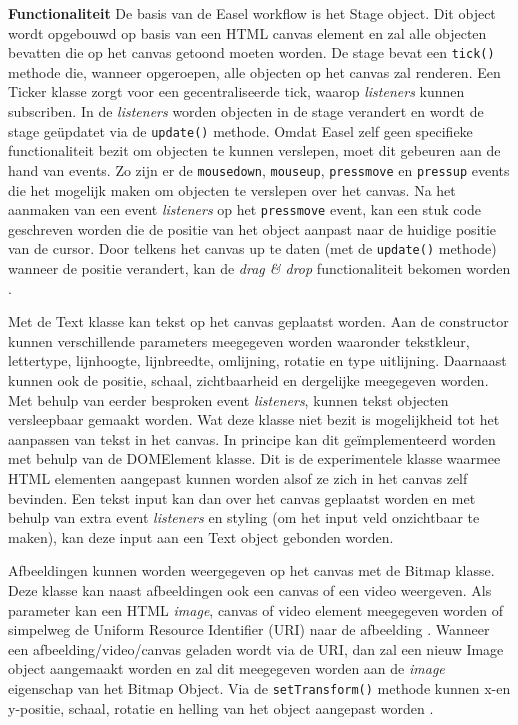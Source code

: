 \textbf{Functionaliteit} \break
De basis van de Easel workflow is het Stage object. Dit object wordt opgebouwd op basis van een HTML canvas element en zal alle objecten bevatten die op het canvas getoond moeten worden. De stage bevat een \texttt{tick()} methode die, wanneer opgeroepen, alle objecten op het canvas zal renderen. Een Ticker klasse zorgt voor een gecentraliseerde tick, waarop \textit{listeners} kunnen subscriben. In de \textit{listeners} worden objecten in de stage verandert en wordt de stage ge\"{u}pdatet via de \texttt{update()} methode. Omdat Easel zelf geen specifieke functionaliteit bezit om objecten te kunnen verslepen, moet dit gebeuren aan de hand van events. Zo zijn er de \texttt{mousedown}, \texttt{mouseup}, \texttt{pressmove} en \texttt{pressup} events die het mogelijk maken om objecten te verslepen over het canvas. Na het aanmaken van een event \textit{listeners} op het \texttt{pressmove} event, kan een stuk code geschreven worden die de positie van het object aanpast naar de huidige positie van de cursor. Door telkens het canvas up te daten (met de \texttt{update()} methode) wanneer de positie verandert, kan de \textit{drag \& drop} functionaliteit bekomen worden \cite{EaselMouseInteraction}.  

Met de Text klasse kan tekst op het canvas geplaatst worden. Aan de constructor kunnen verschillende parameters meegegeven worden waaronder tekstkleur, lettertype, lijnhoogte, lijnbreedte, omlijning, rotatie en type uitlijning. Daarnaast kunnen ook de positie, schaal, zichtbaarheid en dergelijke meegegeven worden. Met behulp van eerder besproken event \textit{listeners}, kunnen tekst objecten versleepbaar gemaakt worden. Wat deze klasse niet bezit is mogelijkheid tot het aanpassen van tekst in het canvas. In principe kan dit ge\"{i}mplementeerd worden met behulp van de DOMElement klasse. Dit is de experimentele klasse waarmee HTML elementen aangepast kunnen worden alsof ze zich in het canvas zelf bevinden. Een tekst input kan dan over het canvas geplaatst worden en met behulp van extra event \textit{listeners} en styling (om het input veld onzichtbaar te maken), kan deze input aan een Text object gebonden worden. 

Afbeeldingen kunnen worden weergegeven op het canvas met de Bitmap klasse. Deze klasse kan naast afbeeldingen ook een canvas of een video weergeven. Als parameter kan een HTML \textit{image}, canvas of video element meegegeven worden of simpelweg de Uniform Resource Identifier (URI) naar de afbeelding \cite{URI}. Wanneer een afbeelding/video/canvas geladen wordt via de URI, dan zal een nieuw Image object aangemaakt worden en zal dit meegegeven worden aan de \textit{image} eigenschap van het Bitmap Object. Via de \texttt{setTransform()} methode kunnen x-en y-positie, schaal, rotatie en helling van het object aangepast worden \cite{EaselDocs}. 

